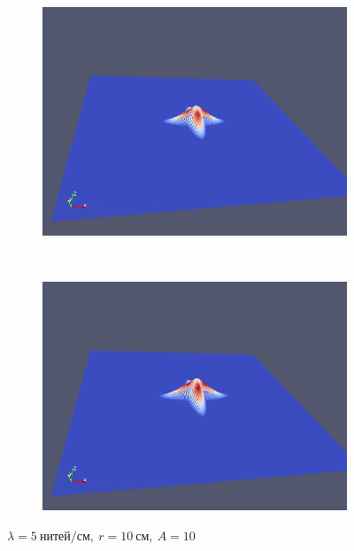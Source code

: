 \begin{figure}[H]
\begin{subfigure}[t]{0.5\textwidth}
        \includegraphics[width=\textwidth]{img/fiber/density_5_radius_10_amplitude_10/5.png}
    \end{subfigure}%
    ~
    \begin{subfigure}[t]{0.5\textwidth}
        \centering
        \includegraphics[width=\textwidth]{img/fiber/density_5_radius_10_amplitude_10/6.png}
    \end{subfigure}
    \caption{$\lambda=5~нитей/см,~r=10~см,~A=10$}
\end{figure}
